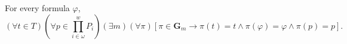 For every formula $\varphi$,
$$(\forall t \in T) \left( \forall p \in \prod_{i \in \omega}^{w} P_i \right) (\exists m) (\forall \pi) [\pi \in \mathbf{G}_m \rightarrow \pi(t) = t \wedge \pi(\varphi) = \varphi \wedge \pi(p) = p].$$
